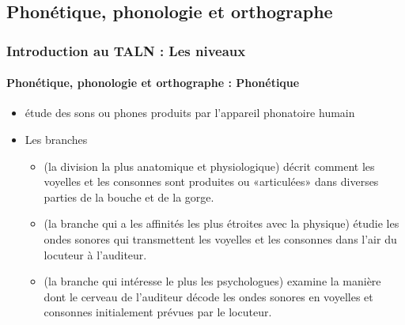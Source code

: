 \documentclass{beamer}
\begin{document}
\subsection{Phonétique, phonologie et orthographe}

\begin{frame}
\frametitle{Introduction au TALN : Les niveaux}
\framesubtitle{Phonétique, phonologie et orthographe : Phonétique}

\begin{itemize}
	\item étude des sons ou phones produits par l'appareil phonatoire humain
	\item Les branches
	\begin{itemize}
		\item {} (la division la plus anatomique et physiologique) décrit comment les voyelles et les consonnes sont produites ou «articulées» dans diverses parties de la bouche et de la gorge.
		\item {} (la branche qui a les affinités les plus étroites avec la physique) étudie les ondes sonores qui transmettent les voyelles et les consonnes dans l'air du locuteur à l'auditeur.
		\item {} (la branche qui intéresse le plus les psychologues) examine la manière dont le cerveau de l'auditeur décode les ondes sonores en voyelles et consonnes initialement prévues par le locuteur.
	\end{itemize}
\end{itemize}

\end{frame}
\end{document}
